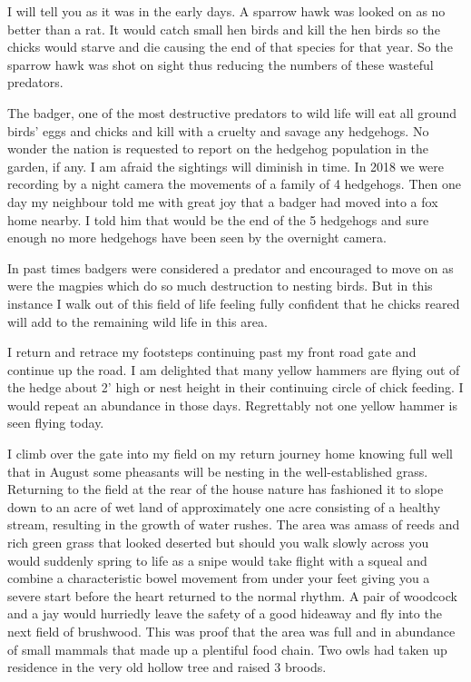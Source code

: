 I will tell you as it was in the early days. A sparrow hawk was looked on as no
better than a rat. It would catch small hen birds and kill the hen birds so
the chicks would starve and die causing the end of that species for that year.
So the sparrow hawk was shot on sight thus reducing the numbers of these
wasteful predators.

The badger, one of the most destructive predators to wild life will eat all
ground birds' eggs and chicks and kill with a cruelty and savage any hedgehogs.
No wonder the nation is requested to report on the hedgehog population in the
garden, if any. I am afraid the sightings will diminish in time. In 2018 we
were recording by a night camera the movements of a family of 4 hedgehogs. Then
one day my neighbour told me with great joy that a badger had moved into a fox
home nearby. I told him that would be the end of the 5 hedgehogs and sure
enough no more hedgehogs have been seen by the overnight camera.

In past times badgers were considered a predator and encouraged to move on as
were the magpies which do so much destruction to nesting birds. But in this
instance I walk out of this field of life feeling fully confident that he
chicks reared will add to the remaining wild life in this area.

I return and retrace my footsteps continuing past my front road gate and
continue up the road. I am delighted that many yellow hammers are flying out
of the hedge about 2' high or nest height in their continuing circle of chick
feeding. I would repeat an abundance in those days. Regrettably not one
yellow hammer is seen flying today.

I climb over the gate into my field on my return journey home knowing full well
that in August some pheasants will be nesting in the well-established grass.
Returning to the field at the rear of the house nature has fashioned it to
slope down to an acre of wet land of approximately one acre consisting of a
healthy stream, resulting in the growth of water rushes. The area was amass of
reeds and rich green grass that looked deserted but should you walk slowly
across you would suddenly spring to life as a snipe would take flight with a
squeal and combine a characteristic bowel movement from under your feet giving
you a severe start before the heart returned to the normal rhythm. A pair of
woodcock and a jay would hurriedly leave the safety of a good hideaway and fly
into the next field of brushwood. This was proof that the area was full and in
abundance of small mammals that made up a plentiful food chain. Two owls had
taken up residence in the very old hollow tree and raised 3 broods.

